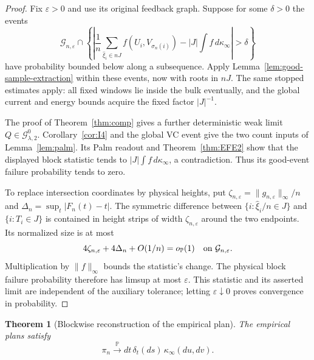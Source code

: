 \documentclass[11pt,reqno]{amsart}
\newtheorem{theorem}{Theorem}[section]
\theoremstyle{definition}
\theoremstyle{remark}
\numberwithin{equation}{section}
\newcommand{\Pp}{\mathbb P}
\begin{document}
\begin{proof}
Fix \(\varepsilon>0\) and use its original feedback graph.  Suppose
for some \(\delta>0\) the events
\[
\mathcal G_{n,\varepsilon}\cap
\left\{\left|\frac1n\sum_{\widehat\xi_i\in nJ}
 f(U_i,V_{\sigma_n(i)})-|J|\int f\,d\kappa_\infty\right|>\delta\right\}
\]
have probability bounded below along a subsequence.  Apply
Lemma~\ref{lem:good-sample-extraction} within these events, now with
roots in \(nJ\).  The same stopped estimates apply: all fixed windows
lie inside the bulk eventually, and the global current and energy
bounds acquire the fixed factor \(|J|^{-1}\).

The proof of Theorem~\ref{thm:comp} gives a further deterministic weak limit
\(Q\in\mathcal G_{\lambda,2}^0\).  Corollary~\ref{cor:I4} and the
global VC event give the two count inputs of Lemma~\ref{lem:palm}.
Its Palm readout and Theorem~\ref{thm:EFE2} show that the displayed block statistic tends
to \(|J|\int f\,d\kappa_\infty\), a contradiction.
Thus its good-event failure probability tends to zero.

To replace intersection coordinates by physical heights, put
\(\zeta_{n,\varepsilon}=\|g_{n,\varepsilon}\|_\infty/n\) and
\(\Delta_n=\sup_t|F_n(t)-t|\).
The symmetric difference between
\(\{i:\widehat\xi_i/n\in J\}\) and \(\{i:T_i\in J\}\)
is contained in height strips of width \(\zeta_{n,\varepsilon}\)
around the two endpoints.  Its normalized size is at most
\begin{equation}
4\zeta_{n,\varepsilon}+4\Delta_n+O(1/n)
 =o_{\Pp}(1)\quad\hbox{on }\mathcal G_{n,\varepsilon}.
\label{eq:6.4d}
\end{equation}
Multiplication by \(\|f\|_\infty\) bounds the statistic's change.
The physical block failure probability therefore has limsup at most
\(\varepsilon\).  This statistic and its asserted limit are independent
of the auxiliary tolerance; letting \(\varepsilon\downarrow0\)
proves convergence in probability.
\end{proof}

\begin{theorem}[Blockwise reconstruction of the empirical plan]
\label{thm:reconstruct}
The empirical plans satisfy
\begin{equation}
\boxed{
\pi_n
\xrightarrow{\Pp}
dt\,\delta_t(ds)\,\kappa_\infty(du,dv).
}
\label{eq:6.4}
\end{equation}
\end{theorem}
\end{document}
